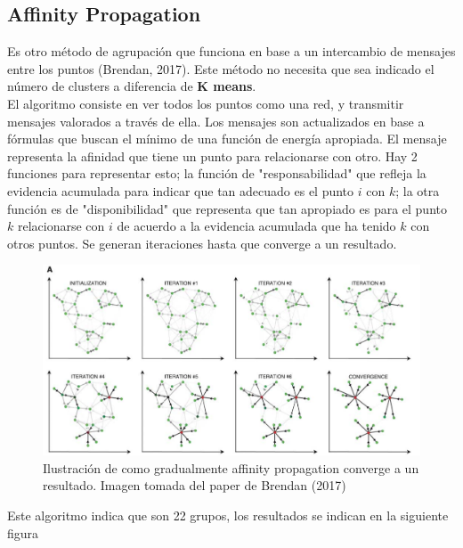 \documentclass[12pt,spanish]{article}
\begin{document}
	\subsection{Affinity Propagation}
	Es otro método de agrupación que funciona en base a un intercambio de mensajes entre los puntos (Brendan, 2017). Este método no necesita que sea indicado el número de clusters a diferencia de \textbf{K means}.\\
	El algoritmo consiste en ver todos los puntos como una red, y transmitir mensajes valorados a través de ella. Los mensajes son actualizados en base a fórmulas que buscan el mínimo de una función de energía apropiada. El mensaje representa la afinidad que tiene un punto para relacionarse con otro. Hay 2 funciones para representar esto; la función de "responsabilidad" que refleja la evidencia acumulada para indicar que tan adecuado es el punto $i$ con $k$; la otra función es de "disponibilidad" que representa que tan apropiado es para el punto $k$ relacionarse con $i$ de acuerdo a la evidencia acumulada que ha tenido $k$ con otros puntos. Se generan iteraciones hasta que converge a un resultado.
	\begin{figure}[H]
		\centering
		\includegraphics[width=15cm]{Imagenes/ap_funcionamiento.png}
		\begin{centering}
			\caption{Ilustración de como gradualmente affinity propagation converge a un resultado. Imagen tomada del paper de Brendan (2017)}
		\end{centering}
	\end{figure}
	Este algoritmo indica que son 22 grupos, los resultados se indican en la siguiente figura
\end{document}
